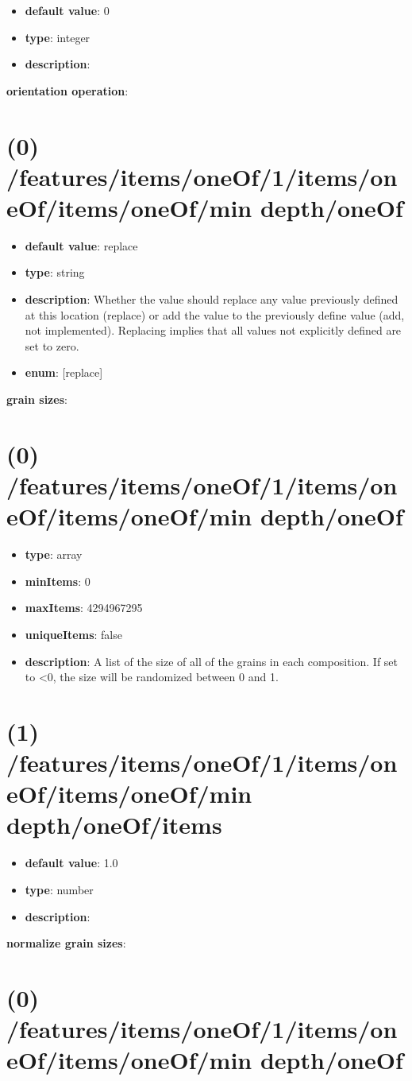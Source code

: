\begin{itemize}[leftmargin=1em]\item {\bf default value}: 0
\item {\bf type}: integer
\item {\bf description}: 
\end{itemize}\item {\bf orientation operation}: \section{(0) /features/items/oneOf/1/items/oneOf/items/oneOf/min depth/oneOf}
\begin{itemize}[leftmargin=0em]\item {\bf default value}: replace
\item {\bf type}: string
\item {\bf description}: Whether the value should replace any value previously defined at this location (replace) or add the value to the previously define value (add, not implemented). Replacing implies that all values not explicitly defined are set to zero.
\item {\bf enum}: [replace]\end{itemize}\item {\bf grain sizes}: \section{(0) /features/items/oneOf/1/items/oneOf/items/oneOf/min depth/oneOf}
\begin{itemize}[leftmargin=0em]\item {\bf type}: array
\item {\bf minItems}: 0
\item {\bf maxItems}: 4294967295
\item {\bf uniqueItems}: false
\item {\bf description}: A list of the size of all of the grains in each composition. If set to <0, the size will be randomized between 0 and 1.
\end{itemize}\section{(1) /features/items/oneOf/1/items/oneOf/items/oneOf/min depth/oneOf/items}
\begin{itemize}[leftmargin=1em]\item {\bf default value}: 1.0
\item {\bf type}: number
\item {\bf description}: 
\end{itemize}\item {\bf normalize grain sizes}: \section{(0) /features/items/oneOf/1/items/oneOf/items/oneOf/min depth/oneOf}
